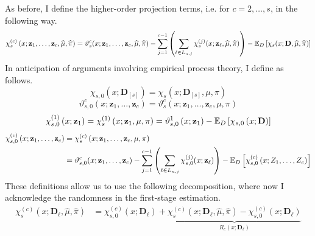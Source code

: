 As before, I define the higher-order projection terms, i.e. for $c = 2, \dotsc, s$, in the following way.
\begin{equation}
    \chi_{s}^{(c)}\left(x; \mathbf{z}_{1}, \dotsc, \mathbf{z}_{c}, \widehat{\mu}, \widehat{\pi}\right)
	= \vartheta_{s}^{c}(x; \mathbf{z}_{1}, \dotsc, \mathbf{z}_{c}, \widehat{\mu}, \widehat{\pi}) 
    - \sum_{j = 1}^{c-1}\left(\sum_{\ell \in L_{n,j}} \chi_{s}^{(j)}(x; \mathbf{z}_{\ell}, \widehat{\mu}, \widehat{\pi})\right) 
    - \mathbb{E}_{D}\left[\chi_{s}(x; \mathbf{D}, \widehat{\mu}, \widehat{\pi})\right]
\end{equation}
In anticipation of arguments involving empirical process theory, I define as follows.
\begin{equation}
    \chi_{s, 0}(x; \mathbf{D}_{[s]})
    = \chi_{s}(x; \mathbf{D}_{[s]}, \mu, \pi)
\end{equation}
\begin{equation}
    \vartheta_{s,0}^{c}\left(x; \mathbf{z}_{1}, \dotsc, \mathbf{z}_{c}\right)
    = \vartheta_{s}^{c}\left(x; \mathbf{z}_{1}, \dotsc, \mathbf{z}_{c}, \mu, \pi\right)
\end{equation}
\begin{equation}
    \chi_{s,0}^{(1)}\left(x; \mathbf{z}_{1}\right)
	= \chi_{s}^{(1)}\left(x; \mathbf{z}_{1}, \mu, \pi\right)
    = \vartheta_{s,0}^{1}\left(x; \mathbf{z}_{1}\right) 
    - \mathbb{E}_{D}\left[\chi_{s,0}\left(x; \mathbf{D}\right)\right]
\end{equation}
\begin{equation}
    \begin{aligned}
        \chi_{s,0}^{(c)}\left(x; \mathbf{z}_{1}, \dotsc, \mathbf{z}_{c}\right)
	    & = \chi_{s}^{(c)}\left(x; \mathbf{z}_{1}, \dotsc, \mathbf{z}_{c}, \mu, \pi\right) \\
        & = \vartheta_{s,0}^{c}(x; \mathbf{z}_{1}, \dotsc, \mathbf{z}_{c}) 
        - \sum_{j = 1}^{c-1}\left(\sum_{\ell \in L_{n,j}} \chi_{s,0}^{(j)}(x; \mathbf{z}_{\ell})\right) 
        - \mathbb{E}_{D}\left[\chi_{s,0}^{(c)}\left(x; Z_{1}, \dotsc, Z_{c}\right)\right]
    \end{aligned}
\end{equation}
These definitions allow us to use the following decomposition, where now I acknowledge the randomness in the first-stage estimation.
\begin{equation}\label{eq:DNNDML2_ResidDecomp}
    \begin{aligned}
        \chi_{s}^{(c)}\left(x; \mathbf{D}_{\ell}, \hat{\mu}, \hat{\pi}\right)
        & = \chi_{s,0}^{(c)}\left(x; \mathbf{D}_{\ell}\right) + \underbrace{\chi_{s}^{(c)}\left(x; \mathbf{D}_{\ell}, \hat{\mu}, \hat{\pi}\right) - \chi_{s,0}^{(c)}\left(x; \mathbf{D}_{\ell}\right)}_{R_{c}\left(x; \mathbf{D}_{\ell}\right)}
    \end{aligned}
\end{equation}
